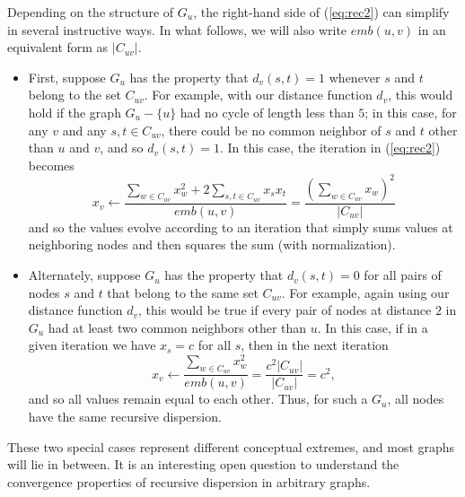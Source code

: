 \documentclass{sigchi}
\begin{document}
Depending on the structure of $G_u$, the right-hand side of
(\ref{eq:rec2}) can simplify in several instructive ways.
In what follows, we will also write $emb(u,v)$ in an equivalent
form as $|C_{uv}|$.
\begin{itemize}
\item 
First, suppose $G_u$ has the property that $d_v(s,t) = 1$ whenever
$s$ and $t$ belong to the set $C_{uv}$.
For example, with our distance function $d_v$,
this would hold if the graph $G_u - \{u\}$ 
had no cycle of length
less than $5$; in this case, for any $v$ and any $s, t \in C_{uv}$,
there could be no common neighbor of $s$ and $t$ other than $u$ and $v$,
and so $d_v(s,t) = 1$.
In this case, the iteration in (\ref{eq:rec2}) becomes
\begin{equation}
x_v \longleftarrow
  \frac{    \sum_{w \in C_{uv}} x_w^2
        + 2 \sum_{s, t \in C_{uv}} x_s x_t}
       {emb(u,v)}
= \frac{\left(\sum_{w \in C_{uv}} x_w\right)^2}{|C_{uv}|}
\end{equation}
and so the values evolve according to an iteration that simply sums
values at neighboring nodes and then squares the sum (with
normalization).
\item
Alternately, suppose $G_u$ has the property that $d_v(s,t) = 0$
for all pairs of nodes $s$ and $t$ that belong to the same set $C_{uv}$.
For example, again using our distance function $d_v$, this would be true 
if every pair of nodes at distance $2$ in $G_u$ had at least two
common neighbors other than $u$.
In this case, if in a given iteration we have $x_s = c$ for all $s$,
then in the next iteration
\begin{equation}
x_v \longleftarrow
  \frac{    \sum_{w \in C_{uv}} x_w^2}
       {emb(u,v)}
= \frac{ c^2 |C_{uv}| }{ |C_{uv}| }
= c^2,
\end{equation}
and so all values remain equal to each other.  Thus, for such a $G_u$,
all nodes have the same recursive dispersion.
\end{itemize}

These two special cases represent different conceptual extremes, and
most graphs will lie in between.  
It is an interesting open question
to understand the convergence properties of recursive dispersion in
arbitrary graphs.
\end{document}
